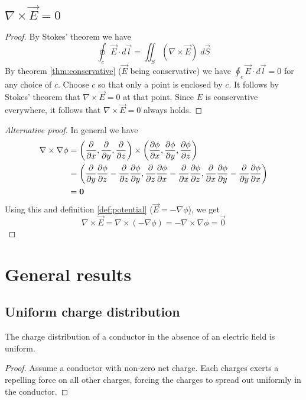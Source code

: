 \subsection{$\nabla\times\vec{E} = 0$}
\begin{proof}
  By Stokes' theorem we have
  \begin{equation*}
    \oint_c \vec{E}\cdot d\vec{l} = \iint_S (\nabla\times\vec{E})\;d\vec{S}
  \end{equation*}
  By theorem \ref{thm:conservative} ($\vec{E}$ being conservative) we
  have $\oint_c \vec{E}\cdot d\vec{l} = 0$ for any choice of $c$. Choose
  $c$ so that only a point is enclosed by $c$. It follows by Stokes'
  theorem that $\nabla\times\vec{E}=0$ at that point. Since $E$ is
  conservative everywhere, it follows that $\nabla\times\vec{E}=0$
  always holds.
\end{proof}

\begin{proof}[Alternative proof]
  In general we have
  \begin{align*}
    \nabla\times\nabla\phi &= \left(\frac{\partial}{\partial x},\frac{\partial}{\partial y},\frac{\partial}{\partial z}\right)\times\left(\frac{\partial \phi}{\partial x},
    \frac{\partial \phi}{\partial y}, \frac{\partial \phi}{\partial z}\right) \\
    &= \left(
         \frac{\partial}{\partial y}\frac{\partial \phi}{\partial z}-\frac{\partial}{\partial z}\frac{\partial \phi}{\partial y},
         \frac{\partial}{\partial z}\frac{\partial \phi}{\partial x}-\frac{\partial}{\partial x}\frac{\partial \phi}{\partial z},
         \frac{\partial}{\partial x}\frac{\partial \phi}{\partial y}-\frac{\partial}{\partial y}\frac{\partial \phi}{\partial x}
       \right) \\
    &= \boldsymbol{0}
  \end{align*}
  Using this and definition \ref{def:potential} ($\vec{E} = - \nabla\phi$),
  we get
  \begin{equation*}
    \nabla\times\vec{E} = \nabla\times(-\nabla\phi) =
    -\nabla\times\nabla\phi = \vec{0}
  \end{equation*}
\end{proof}




\section{General results}

\subsection{Uniform charge distribution}
\label{uniform charge distribution}
The charge distribution of a conductor in the absence of an electric
field is uniform.
\begin{proof}
  Assume a conductor with non-zero net charge. Each charges exerts a
  repelling force on all other charges, forcing the charges to spread
  out uniformly in the conductor.
\end{proof}

